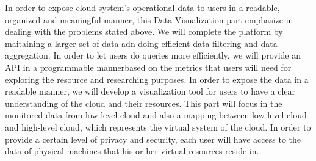   In order to expose cloud system's operational data to users in a readable, organized and meaningful manner, this Data Visualization part emphasize in dealing with the problems stated above. We will complete the platform by  maitaining a larger set of data adn doing efficient data filtering and data aggregation. In order to let users do queries more efficiently, we will provide an API in a programmable mannerbased on the metrics that users will need for exploring the resource and researching purposes. In order to expose the data in a readable manner, we will develop a visualization tool for users to have a clear understanding of the cloud and their resources. This part will focus in the monitored data from low-level cloud and also a mapping between low-level cloud and high-level cloud, which represents the virtual system of the cloud. In order to provide a certain level of privacy and security, each user will have access to the data of physical machines that his or her virtual resources reside in. 